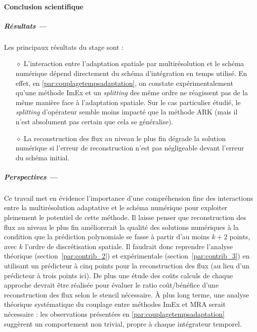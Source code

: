 \label{par:cc}
\paragraph*{Conclusion scientifique}\label{par:cc1}
\subparagraph*{Résultats —}  
Les principaux résultats du stage sont : 
\begin{itemize}
    \item[$\diamond$] L'interaction entre l'adaptation spatiale par multirésolution et le schéma numérique dépend directement du schéma d'intégration en temps utilisé.
    En effet, en \ref{par:couplagetempsadaptation}, on constate expérimentalement qu'une méthode ImEx et un \emph{splitting} des même ordre ne réagissent pas de la même manière face à l'adaptation spatiale.
    Sur le cas particulier étudié, le \textit{splitting} d'opérateur semble moins impacté que la méthode ARK (mais il n'est absolument pas certain que cela se généralise).
    \item[$\diamond$] La reconstruction des flux au niveau le plus fin dégrade la solution numérique si l'erreur de reconstruction n'est pas négligeable devant l'erreur du schéma initial.
\end{itemize}

\medskip
\subparagraph*{Perspectives —}  
Ce travail met en évidence l'importance d'une compréhension fine des interactions 
entre la multirésolution adaptative et le schéma numérique pour exploiter pleinement le potentiel de cette méthode.  
Il laisse penser que reconstruction des flux au niveau le plus fin améliorerait la qualité des solutions numériques à la condition que la prédiction polynomiale 
se fasse à partir d'au moins \(k+2\) points, avec \(k\) l'ordre de discrétisation spatiale.
Il faudrait donc reprendre l'analyse théorique (section~\ref{par:contrib_2}) 
et expérimentale (section~\ref{par:contrib_3}) en utilisant un prédicteur à cinq points pour la reconstruction des flux (au lieu d'un prédicteur à trois points ici).
De plus une étude des coûts calculs de chaque approche devrait être réalisée
pour évaluer le ratio coût/bénéfice d'une reconstruction des flux selon le stencil nécessaire.
À plus long terme, une analyse théorique systématique du couplage entre méthodes ImEx et MRA serait nécessaire : les observations présentées en \ref{par:couplagetempsadaptation} suggèrent un comportement non trivial, propre à chaque intégrateur temporel.

